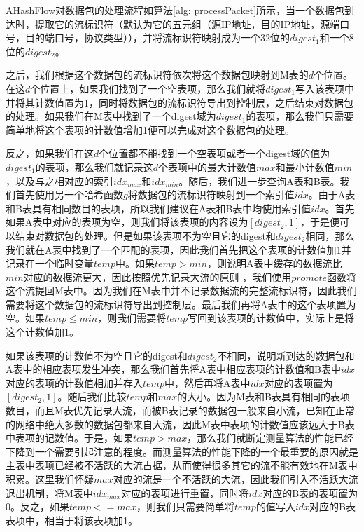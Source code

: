 \documentclass{article}
\begin{document}
AHashFlow对数据包的处理流程如算法\ref{alg: processPacket}所示，当一个数据包到达时，提取它的流标识符（默认为它的五元组（源IP地址，目的IP地址，源端口号，目的端口号，协议类型）），并将流标识符映射成为一个32位的$digest_1$和一个8位的$digest_2$。

之后，我们根据这个数据包的流标识符依次将这个数据包映射到M表的$d$个位置。在这$d$个位置上，如果我们找到了一个空表项，那么我们就将$digest_1$写入该表项中并将其计数值置为1，同时将数据包的流标识符导出到控制层，之后结束对数据包的处理。如果我们在M表中找到了一个digest域为$digest_1$的表项，那么我们只需要简单地将这个表项的计数值增加1便可以完成对这个数据包的处理。

反之，如果我们在这$d$个位置都不能找到一个空表项或者一个digest域的值为$digest_1$的表项，那么我们就记录这$d$个表项中的最大计数值$max$和最小计数值$min$，以及与之相对应的索引$idx_{max}$和$idx_{min}$。随后，我们进一步查询A表和B表。我们首先使用另一个哈希函数$g$将数据包的流标识符映射到一个索引值$idx$。由于A表和B表具有相同数目的表项，所以我们建议在A表和B表中均使用索引值$idx$。首先如果A表中对应的表项为空，则我们将该表项的内容设为$[digest_2, 1]$，于是便可以结束对数据包的处理。但是如果该表项不为空且它的digest和$digest_2$相同，那么我们就在A表中找到了一个匹配的表项，因此我们首先把这个表项的计数值加1并记录在一个临时变量$temp$中。如果$temp > min$，则说明A表中缓存的数据流比$min$对应的数据流更大，因此按照优先记录大流的原则 ，我们使用$promote$函数将这个流提回M表中。因为我们在M表中并不记录数据流的完整流标识符，因此我们需要将这个数据包的流标识符导出到控制层。最后我们再将A表中的这个表项置为空。如果$temp \le min$，则我们需要将$temp$写回到该表项的计数值中，实际上是将这个计数值加1。

如果该表项的计数值不为空且它的digest和$digest_2$不相同，说明新到达的数据包和A表中的相应表项发生冲突，那么我们首先将A表中相应表项的计数值和B表中$idx$对应的表项的计数值相加并存入$temp$中，然后再将A表中$idx$对应的表项置为$[digest_2, 1]$。随后我们比较$temp$和$max$的大小。因为M表和B表具有相同的表项数目，而且M表优先记录大流，而被B表记录的数据包一般来自小流，已知在正常的网络中绝大多数的数据包都来自大流，因此M表中表项的计数值应该远大于B表中表项的记数值。于是，如果$temp>max$，那么我们就断定测量算法的性能已经下降到一个需要引起注意的程度。而测量算法的性能下降的一个最重要的原因就是主表中表项已经被不活跃的大流占据，从而使得很多其它的流不能有效地在M表中积累。这里我们怀疑$max$对应的流是一个不活跃的大流，因此我们引入不活跃大流退出机制，将M表中$idx_{max}$对应的表项进行重置，同时将$idx$对应的B表的表项置为0。反之，如果$temp <= max$，则我们只需要简单将$temp$的值写入$idx$对应的B表表项中，相当于将该表项加1。
\end{document}

